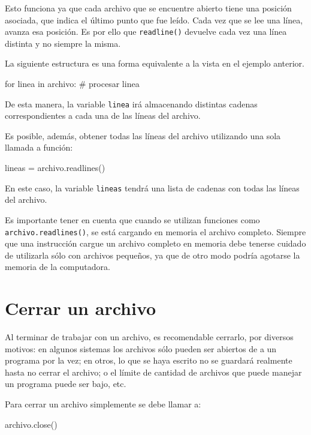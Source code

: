 Esto funciona ya que cada archivo que se encuentre abierto tiene una
posición asociada, que indica el último punto que fue leído.  Cada vez que
se lee una línea, avanza esa posición. Es por ello que
\lstinline!readline()! devuelve cada vez una línea distinta y no siempre la
misma.

La siguiente estructura es una forma equivalente a la vista en el ejemplo
anterior.

\begin{codigo-python-sn}
for linea in archivo:
    # procesar linea
\end{codigo-python-sn}

De esta manera, la variable \lstinline!linea! irá almacenando distintas cadenas
correspondientes a cada una de las líneas del archivo.

Es posible, además, obtener todas las líneas del archivo utilizando una
sola llamada a función:

\begin{codigo-python-sn}
lineas = archivo.readlines()
\end{codigo-python-sn}

En este caso, la variable \lstinline!lineas! tendrá una lista de cadenas con
todas las líneas del archivo.

\begin{atencion}
Es importante tener en cuenta que cuando se utilizan funciones como
\lstinline!archivo.readlines()!, se está cargando en memoria
el archivo completo.  Siempre que una instrucción cargue un archivo
completo en memoria debe tenerse cuidado de utilizarla sólo con archivos
pequeños, ya que de otro modo podría agotarse la memoria de la computadora.
\end{atencion}

\section{Cerrar un archivo}

Al terminar de trabajar con un archivo, es recomendable cerrarlo,
por diversos motivos: en algunos sistemas los archivos sólo pueden
ser abiertos de a un programa por la vez; en otros, lo que se haya
escrito no se guardará realmente hasta no cerrar el archivo; o el
límite de cantidad de archivos que puede manejar un programa puede
ser bajo, etc.

Para cerrar un archivo simplemente se debe llamar a:
\begin{codigo-python-sn}
archivo.close()
\end{codigo-python-sn}

